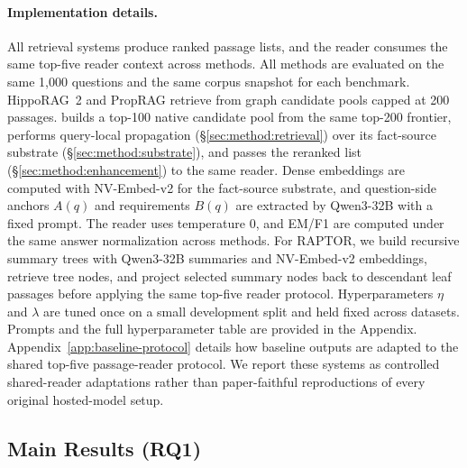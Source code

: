 \paragraph{Implementation details.}
All retrieval systems produce ranked passage lists, and the reader
consumes the same top-five reader context across methods. All methods
are evaluated on the same 1{,}000 questions and the same corpus
snapshot for each benchmark. HippoRAG~2 and PropRAG retrieve from graph
candidate pools capped at 200 passages.
\methodname{} builds a top-100 native candidate pool from the same
top-200 frontier, performs query-local propagation
(\S\ref{sec:method:retrieval}) over its fact-source substrate
(\S\ref{sec:method:substrate}), and passes the reranked list
(\S\ref{sec:method:enhancement}) to the same reader. Dense embeddings
are computed with NV-Embed-v2 for the fact-source substrate, and
question-side anchors $A(q)$ and requirements $B(q)$ are extracted by
Qwen3-32B with a fixed prompt. The reader uses temperature 0, and
EM/F1 are computed under the same answer normalization across methods.
For RAPTOR, we build recursive summary trees with Qwen3-32B summaries
and NV-Embed-v2 embeddings, retrieve tree nodes, and project selected
summary nodes back to descendant leaf passages before applying the same
top-five reader protocol.
Hyperparameters $\eta$ and $\lambda$ are tuned once on a small
development split and held fixed across datasets. Prompts and the full
hyperparameter table are provided in the Appendix.
Appendix~\ref{app:baseline-protocol} details how baseline outputs are
adapted to the shared top-five passage-reader protocol.
We report these systems as controlled shared-reader adaptations rather
than paper-faithful reproductions of every original hosted-model setup.

\subsection{Main Results (RQ1)}
\label{sec:experiments:main}

